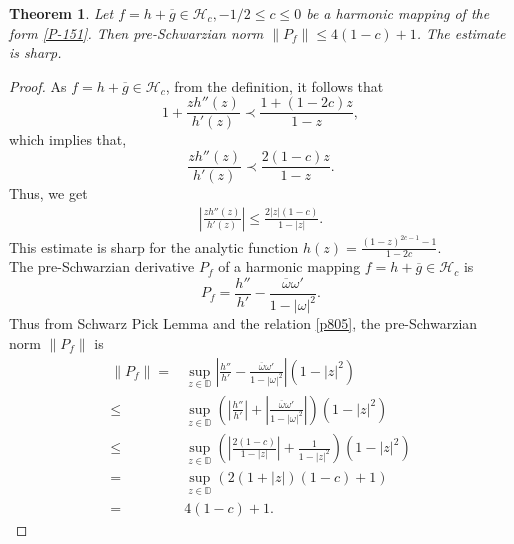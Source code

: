 \documentclass[a4paper,12pt]{amsart}
\newtheorem{thm}{Theorem}[section]
\theoremstyle{definition}
\begin{document}
	\begin{thm}\label{p807}
		Let $f=h+\overline{g}\in\mathcal{H}_c, -1/2\le c\le 0$ be a harmonic mapping of the form \eqref{P-151}. Then pre-Schwarzian norm $\|P_f\|\le 4(1-c)+1$. The estimate is sharp. 
	\end{thm}
	\begin{proof}
		As $f=h+\overline{g}\in\mathcal{H}_c$, from the definition, it follows that
		$$1+\frac{zh''(z)}{h'(z)}\prec\frac{1+(1-2c)z}{1-z},$$ which implies that,
		$$\frac{zh''(z)}{h'(z)}\prec\frac{2(1-c)z}{1-z}.$$ Thus, we get
		\begin{align}\label{p805}
			\left|\frac{zh''(z)}{h'(z)}\right|\le \frac{2|z|(1-c)}{1-|z|}.
		\end{align}
		This estimate is sharp for the analytic function $h(z)=\frac{(1-z)^{2c-1}-1}{1-2c}.$\\
		
		The pre-Schwarzian derivative $P_f$ of a harmonic mapping $f=h+\overline{g}\in\mathcal{H}_c$ is 
		$$
			P_f=\frac{h''}{h'}-\frac{\overline{\omega}\omega'}{1-|\omega|^2}.
		$$
		Thus from Schwarz Pick Lemma and the relation \eqref{p805}, the pre-Schwarzian norm $\|P_f\|$ is 
		\begin{align}\label{HM-100}
			\|P_f\|= & \sup_{z \in \mathbb{D}}\left|\frac{h''}{h'}-\frac{\overline{\omega}\omega'}{1-|\omega|^2}\right|(1-|z|^2)\\\nonumber
			\le & \sup_{z \in \mathbb{D}}\left(\left|\frac{h''}{h'}\right|+\left|\frac{\overline{\omega}\omega'}{1-|\omega|^2}\right|\right)(1-|z|^2)\\\nonumber
			\le & \sup_{z \in \mathbb{D}}\left(\left|\frac{2(1-c)}{1-|z|}\right|+\frac{1}{1-|z|^2}\right)(1-|z|^2)\\\nonumber
			=& \sup_{z \in \mathbb{D}}\left(2(1+|z|)(1-c)+1\right)\\\nonumber
			=& 4(1-c)+1.
		\end{align}
		

\end{proof}
\end{document}
